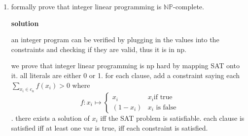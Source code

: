 \documentclass{article}
\begin{document}
\begin{enumerate}
    $\mathcal L = \{\langle M, x, 1^t\rangle | \textrm{M is a non-determinisitic TM
     that runs in t steps and accepts $x$}\}$ is $\mathbb{NP}$-complete.

    \textbf{solution}

    we will map SAT onto this language, and we will provide a certificate that runs in poly time. 

    there exists a way to encode boolean sat problems in unary. convert sat into binary , then conver the binary into unary. \(M_sat\), the normal sat solver, will take these unary strings and outputs accept if satisfiable. this means that SAT is reducable to a subproblem in \(\mathcal{L}\).

    a certificate exists by just running a string on M. since the machine \(M\) runs in polynomial time to the size of the input, and the length of the input is O(the size of the input), M will verify the input in polynomial time.

    therefore the language is \(\mathbb{NP}\)-complete





    \item formally prove that integer linear programming is \(\mathbb{NP}\)-complete. 
    
    
    
    \textbf{solution}
    
    an integer program can be verified by plugging in the values into the constraints and checking if they are valid, thus it is in np.

    we prove that integer linear programming is np hard by mapping SAT onto it. all literals are either 0 or 1. for each clause, add a constraint saying each \(\sum_{x_i\in c_n}^{}f(x_i)>0\) where \begin{equation}
        f:x_{i}\mapsto\begin{cases}
            x_i &x_i \text{if true}\\
            (1-x_i) & x_i\text{ is false}
        \end{cases}
    \end{equation}. there exists a solution of \(x_i\) iff the SAT problem is satisfiable. each clause is satisfied iff at least one var is true, iff each constraint is satisfied.



        
    
    
    
\end{enumerate}
\end{document}

